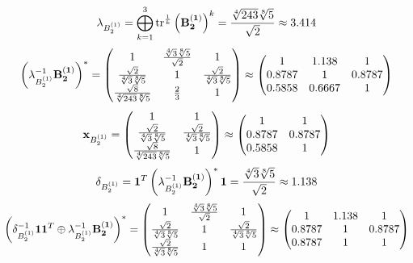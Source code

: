\documentclass[10pt,a4paper]{article}
\begin{document}
	\[
		\lambda_{B_2^{(1)}} =  \bigoplus ^{3} _{k = 1} \operatorname{tr} ^{\frac 1 k} \left( \bold{B_2^{(1)}} \right)^k = \frac{\sqrt[4]{243}\sqrt[8]{5}} {\sqrt{2}}\approx 3.414
	\]
	\[
		\left(\lambda_{B_2^{(1)}}^{-1}\bold{B_2^{(1)}}\right)^* = 
		\begin{pmatrix}
			{1} {} & \frac{\sqrt[4]{3}\sqrt[8]{5}} {\sqrt{2}} & {1} {} \\
			\frac{\sqrt{2}} {\sqrt[4]{3}\sqrt[8]{5}} & {1} {} & \frac{\sqrt{2}} {\sqrt[4]{3}\sqrt[8]{5}} \\
			\frac{\sqrt{8}} {\sqrt[4]{243}\sqrt[8]{5}} & \frac{{2}} {{3}} & {1} {} \\
		\end{pmatrix}
		\approx
		\begin{pmatrix}
			1        & 1.138    & 1        \\
			0.8787   & 1        & 0.8787   \\
			0.5858   & 0.6667   & 1        \\
		\end{pmatrix}
	\]
	\[
		\bold{x}_{B_2^{(1)}} = 
		\begin{pmatrix}
			{1} {} & {1} {} \\
			\frac{\sqrt{2}} {\sqrt[4]{3}\sqrt[8]{5}} & \frac{\sqrt{2}} {\sqrt[4]{3}\sqrt[8]{5}} \\
			\frac{\sqrt{8}} {\sqrt[4]{243}\sqrt[8]{5}} & {1} {} \\
		\end{pmatrix}
		\approx
		\begin{pmatrix}
			1        & 1        \\
			0.8787   & 0.8787   \\
			0.5858   & 1        \\
		\end{pmatrix}
	\]
	\[
		\delta_{B_2^{(1)}} = \bold{1}^T \left(\lambda_{B_2^{(1)}}^{-1}\bold{B_2^{(1)}}\right)^* \bold{1} = \frac{\sqrt[4]{3}\sqrt[8]{5}} {\sqrt{2}}\approx 1.138
	\]
	\[
		\left(\delta_{B_2^{(1)}}^{-1}\bold{11}^T \oplus \lambda_{B_2^{(1)}}^{-1}\bold{B_2^{(1)}}\right)^* = 
		\begin{pmatrix}
			{1} {} & \frac{\sqrt[4]{3}\sqrt[8]{5}} {\sqrt{2}} & {1} {} \\
			\frac{\sqrt{2}} {\sqrt[4]{3}\sqrt[8]{5}} & {1} {} & \frac{\sqrt{2}} {\sqrt[4]{3}\sqrt[8]{5}} \\
			\frac{\sqrt{2}} {\sqrt[4]{3}\sqrt[8]{5}} & {1} {} & {1} {} \\
		\end{pmatrix}
		\approx
		\begin{pmatrix}
			1        & 1.138    & 1        \\
			0.8787   & 1        & 0.8787   \\
			0.8787   & 1        & 1        \\
		\end{pmatrix}
	\]
\end{document}
